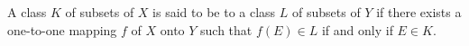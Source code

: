 A class $K$ of subsets of $X$ is said to be  to a class $L$ of subsets of $Y$ if there exists a one-to-one mapping $f$ of $X$ onto $Y$ such that $f(E) \in L$ if and only if $E \in K$.
